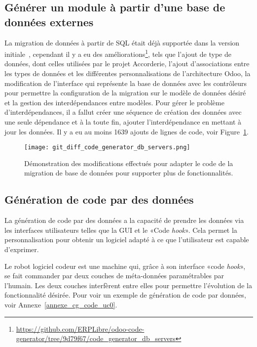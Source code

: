 \subsection{Générer un module à partir d’une base de données externes}


La migration de données à partir de SQL était déjà supportée dans la version initiale~\cite{bluiksnot_repo}, cependant il y a eu des améliorations\footnote{\url{https://github.com/ERPLibre/odoo-code-generator/tree/9d79f67/code_generator_db_servers}}, tels que l'ajout de type de données, dont celles utilisées par le projet Accorderie, l'ajout d'associations entre les types de données et les différentes personnalisations de l’architecture Odoo, la modification de l'interface qui représente la base de données avec les contrôleurs pour permettre la configuration de la migration sur le modèle de données désiré et la gestion des interdépendances entre modèles. Pour gérer le problème d'interdépendances, il a fallut créer une séquence de création des données avec une seule dépendance et à la toute fin, ajouter l'interdépendance en mettant à jour les données. Il y a eu au moins 1639 ajouts de lignes de code, voir Figure~\ref{fig:dia_cg_db_servers}.

\begin{figure}[htb]
\centering
\texttt{[image: git\_diff\_code\_generator\_db\_servers.png]}
\caption{Démonstration des modifications effectués pour adapter le code de la migration de base de données pour supporter plus de fonctionnalités.}
\label{fig:dia_cg_db_servers}
\end{figure}

\subsection{Génération de code par des données}

La génération de code par des données a la capacité de prendre les données via les interfaces utilisateurs telles que la GUI et le «Code \textit{hook}». Cela permet la personnalisation pour obtenir un logiciel adapté à ce que l’utilisateur est capable d’exprimer.

Le robot logiciel codeur est une machine qui, grâce à son interface «code \textit{hook}», se fait commander par deux couches de méta-données paramétrables par l’humain. Les deux couches interfèrent entre elles pour permettre l’évolution de la fonctionnalité désirée. Pour voir un exemple de génération de code par données, voir Annexe~\ref{annexe_cg_code_uc0}.

